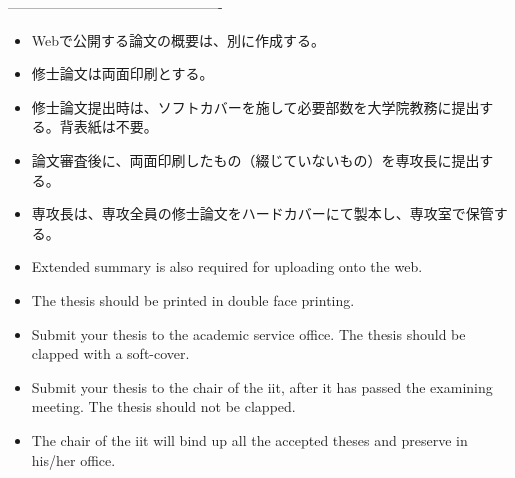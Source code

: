 ﻿\documentclass[11pt,twocolumn]{jarticle} %
\begin{document}
\vspace{3zh}
----------------------------------------------\par

\begin{itemize}
 \item Webで公開する論文の概要は、別に作成する。
 \item 修士論文は両面印刷とする。
 \item 修士論文提出時は、ソフトカバーを施して必要部数を大学院教務に提出する。背表紙は不要。
 \item 論文審査後に、両面印刷したもの（綴じていないもの）を専攻長に提出する。
 \item 専攻長は、専攻全員の修士論文をハードカバーにて製本し、専攻室で保管する。
\end{itemize}

\begin{itemize}
 \item Extended summary is also required for uploading onto the web.
 \item The thesis should be printed in double face printing.
 \item Submit your thesis to the academic service office. The thesis should be clapped with a soft-cover.
 \item  Submit your thesis to the chair of the iit, after it has passed the examining meeting. The thesis should not be clapped.
 \item The chair of the iit will bind up all the accepted theses and preserve in his/her office.
\end{itemize}
\end{document}
